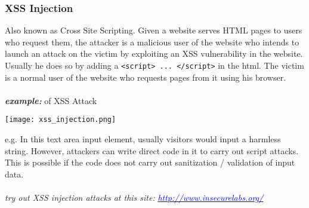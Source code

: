 \documentclass[a4paper]{article}
\begin{document}
\subsubsection{XSS Injection}
Also known as Cross Site Scripting. Given a website serves HTML pages to users who request them, the attacker is a malicious user of the website who intends to launch an attack on the victim by exploiting an XSS vulnerability in the website. Usually he does so by adding a \texttt{<script> ... </script>} in the html. The victim is a normal user of the website who requests pages from it using his browser.\\
\\
\textbf{\textit{example:}} of XSS Attack
\begin{center}
	\texttt{[image: xss\_injection.png]}
\end{center}
e.g. In this text area input element, usually visitors would input a harmless string. However, attackers can write direct code in it to carry out script attacks. This is possible if the code does not carry out sanitization / validation of input data.\\
\\
\textit{try out XSS injection attacks at this site:} \href{http://www.insecurelabs.org/}{\textcolor{blue}{\textit{http://www.insecurelabs.org/}}}
\end{document}
